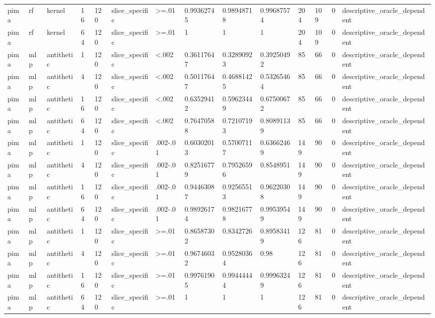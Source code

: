 \begin{tabular}{llllllllllllll}
pima & rf & kernel & 16 & 120 & slice\_specific & >=.01 & 0.99362745 & 0.98948718 & 0.99687574 & 204 & 109 & 0 & descriptive\_oracle\_dependent \\
pima & rf & kernel & 64 & 120 & slice\_specific & >=.01 & 1 & 1 & 1 & 204 & 109 & 0 & descriptive\_oracle\_dependent \\
pima & mlp & antithetic & 1 & 120 & slice\_specific & <.002 & 0.36117647 & 0.32890923 & 0.39250492 & 85 & 66 & 0 & descriptive\_oracle\_dependent \\
pima & mlp & antithetic & 4 & 120 & slice\_specific & <.002 & 0.50117647 & 0.46881425 & 0.53265464 & 85 & 66 & 0 & descriptive\_oracle\_dependent \\
pima & mlp & antithetic & 16 & 120 & slice\_specific & <.002 & 0.63529412 & 0.59623449 & 0.67500672 & 85 & 66 & 0 & descriptive\_oracle\_dependent \\
pima & mlp & antithetic & 64 & 120 & slice\_specific & <.002 & 0.76470588 & 0.72107193 & 0.80891139 & 85 & 66 & 0 & descriptive\_oracle\_dependent \\
pima & mlp & antithetic & 1 & 120 & slice\_specific & .002-.01 & 0.60302013 & 0.57007117 & 0.63662469 & 149 & 90 & 0 & descriptive\_oracle\_dependent \\
pima & mlp & antithetic & 4 & 120 & slice\_specific & .002-.01 & 0.82516779 & 0.79526596 & 0.8548951 & 149 & 90 & 0 & descriptive\_oracle\_dependent \\
pima & mlp & antithetic & 16 & 120 & slice\_specific & .002-.01 & 0.94463087 & 0.92565513 & 0.96220308 & 149 & 90 & 0 & descriptive\_oracle\_dependent \\
pima & mlp & antithetic & 64 & 120 & slice\_specific & .002-.01 & 0.98926174 & 0.98216778 & 0.99539549 & 149 & 90 & 0 & descriptive\_oracle\_dependent \\
pima & mlp & antithetic & 1 & 120 & slice\_specific & >=.01 & 0.86587302 & 0.8342726 & 0.89583419 & 126 & 81 & 0 & descriptive\_oracle\_dependent \\
pima & mlp & antithetic & 4 & 120 & slice\_specific & >=.01 & 0.96746032 & 0.95280364 & 0.98 & 126 & 81 & 0 & descriptive\_oracle\_dependent \\
pima & mlp & antithetic & 16 & 120 & slice\_specific & >=.01 & 0.99761905 & 0.99444444 & 0.99963249 & 126 & 81 & 0 & descriptive\_oracle\_dependent \\
pima & mlp & antithetic & 64 & 120 & slice\_specific & >=.01 & 1 & 1 & 1 & 126 & 81 & 0 & descriptive\_oracle\_dependent \\

\end{tabular}
